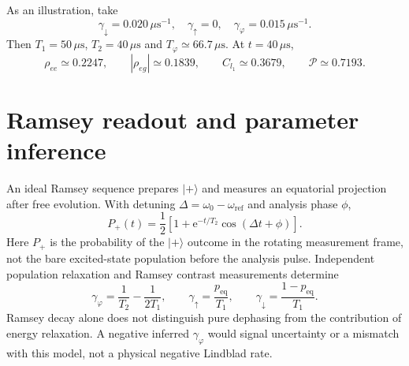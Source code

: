 \documentclass[10pt,a4paper]{article}
\newcommand{\ket}[1]{\lvert #1\rangle}
\newcommand{\ee}{\mathrm{e}}
\begin{document}
As an illustration, take
\begin{equation}
 \gamma_\downarrow=0.020\,\mu\mathrm{s}^{-1},\quad
 \gamma_\uparrow=0,\quad
 \gamma_\varphi=0.015\,\mu\mathrm{s}^{-1}.
 \label{eq:example-rates}
\end{equation}
Then $T_1=50\,\mu\mathrm{s}$, $T_2=40\,\mu\mathrm{s}$ and
$T_\varphi\simeq66.7\,\mu\mathrm{s}$. At $t=40\,\mu\mathrm{s}$,
\begin{equation}
 \rho_{ee}\simeq0.2247,\qquad |\rho_{eg}|\simeq0.1839,\qquad
 C_{l_1}\simeq0.3679,\qquad \mathcal{P}\simeq0.7193.
 \label{eq:numerics}
\end{equation}

\section{Ramsey readout and parameter inference}

An ideal Ramsey sequence prepares $\ket{+}$ and measures an equatorial
projection after free evolution. With detuning
$\Delta=\omega_0-\omega_{\mathrm{ref}}$ and analysis phase $\phi$,
\begin{equation}
 P_+(t)=\frac{1}{2}\left[1+
 \ee^{-t/T_2}\cos(\Delta t+\phi)\right].
 \label{eq:ramsey}
\end{equation}
Here $P_+$ is the probability of the $\ket{+}$ outcome in the rotating
measurement frame, not the bare excited-state population before the
analysis pulse. Independent population relaxation and Ramsey contrast
measurements determine
\begin{equation}
 \gamma_\varphi=\frac{1}{T_2}-\frac{1}{2T_1},\qquad
 \gamma_\uparrow=\frac{p_{\mathrm{eq}}}{T_1},\qquad
 \gamma_\downarrow=\frac{1-p_{\mathrm{eq}}}{T_1}.
 \label{eq:inference}
\end{equation}
Ramsey decay alone does not distinguish pure dephasing from the
contribution of energy relaxation. A negative inferred $\gamma_\varphi$
would signal uncertainty or a mismatch with this model, not a physical
negative Lindblad rate.
\end{document}
